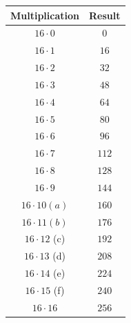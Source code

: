 \documentclass[letterpaper,12pt]{exam}
\begin{document}
\begin{center}
\begin{tabular}{| c | c |}
 \hline
    Multiplication & Result \\
    \hline
 $16 \cdot 0 $ & $ 0 $ \\ 
 $16 \cdot 1 $ & $ 16 $ \\ 
\hline
 $16 \cdot 2 $ & $ 32 $ \\ 
 $16 \cdot 3 $ & $ 48 $ \\ 
\hline
 $16 \cdot 4 $ & $ 64 $ \\ 
 $16 \cdot 5 $ & $ 80 $ \\ 
\hline
 $16 \cdot 6 $ & $ 96 $ \\ 
 $16 \cdot 7 $ & $ 112 $ \\ 
\hline
 $16 \cdot 8 $ & $ 128 $ \\ 
 $16 \cdot 9 $ & $ 144 $ \\ 
\hline
$16 \cdot 10  (a)$ & $ 160 $ \\ 
$16 \cdot 11  (b) $ & $ 176 $ \\ 
\hline
$16 \cdot 12 $ (c) & $ 192 $ \\ 
$16 \cdot 13 $  (d) & $ 208 $ \\ 
\hline
$16 \cdot 14 $  (e)& $ 224 $ \\ 
$16 \cdot 15 $  (f) & $ 240 $ \\ 
\hline
 $16 \cdot 16 $ & $ 256 $ \\   
\hline
\end{tabular}
\end{center}
\end{document}
